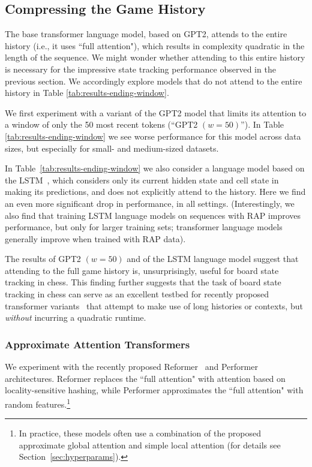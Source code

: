 \documentclass[12pt]{thesis-umich}[thesis]
\begin{document}
\subsection{Compressing the Game History}
\label{sec:other_models}
The base transformer language model, based on GPT2, attends to the entire history (i.e., it uses ``full attention"), which results in complexity quadratic in the length of the sequence. We might wonder whether attending to this entire history is necessary for the impressive state tracking performance observed in the previous section.
We accordingly 
explore models that do not attend to the entire history in Table \ref{tab:results-ending-window}. 

We first experiment with a variant of the GPT2 model that limits its attention to a window of only the 50 most recent tokens (``GPT2 $(w=50)$''). In Table \ref{tab:results-ending-window} we see worse performance for this model across data sizes, but especially for small- and medium-sized datasets. 

In Table~\ref{tab:results-ending-window} we also consider a language model based on the LSTM~\citep{hochreiter1997long}, which considers only its current hidden state and cell state in making its predictions, and does not explicitly attend to the history. Here we find an even more significant drop in performance, in all settings. (Interestingly, we also find that training LSTM language models on sequences with RAP improves performance, but only for larger training sets; transformer language models generally improve when trained with RAP data). 

The results of GPT2 $(w = 50)$ and of the LSTM language model suggest that attending to the full game history is, unsurprisingly, useful for board state tracking in chess. This finding further suggests that the task of board state tracking in chess can serve as an excellent testbed for recently proposed transformer variants~\citep[\textit{inter alia}]{kitaev2020reformer,katharopoulos20,choromanski2021rethinking} that attempt to make use of long histories or contexts, but \textit{without} incurring a quadratic runtime. 



\subsubsection{Approximate Attention Transformers}
\label{sec:limited_history}

We experiment with the recently proposed Reformer~\cite{kitaev2020reformer} and Performer~\cite{choromanski2021rethinking} architectures. Reformer replaces the ``full attention" with attention based on locality-sensitive hashing, while Performer approximates the ``full attention" with random features.\footnote{In practice, these models often use a combination of the proposed approximate global attention and simple local attention (for details see Section~\ref{sec:hyperparams}).}
\end{document}
